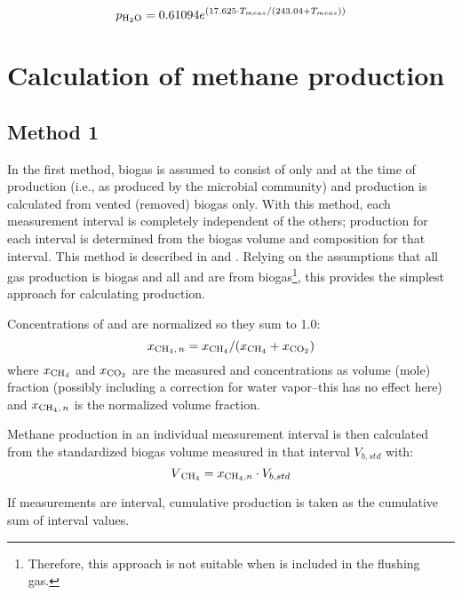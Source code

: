 \documentclass[]{article}
\begin{document}
\begin{equation}
\label{eq:magnus}
   p\textsubscript{H$_2$O} = 0.61094 e^{(17.625 \cdot T_{meas}/(243.04 + T_{meas}))}
\end{equation}

\section{Calculation of methane production}

\subsection{Method 1}
In the first method, biogas is assumed to consist of only  and  at the time of production (i.e., as produced by the microbial community) and  production is calculated from vented (removed) biogas only.
With this method, each measurement interval is completely independent of the others;  production for each interval is determined from the biogas volume and composition for that interval.
This method is described in \citet[Section 3]{richardsMethodsKineticanalysisMethane1991} and \citet[Eq. (7)]{vdiFermentationOrganicMaterials2016}.
Relying on the assumptions that all gas production is biogas and all  and  are from biogas\footnote{
  Therefore, this approach is not suitable when  is included in the flushing gas.
}, this provides the simplest approach for calculating  production.

Concentrations of  and  are normalized so they sum to 1.0:
\begin{equation}
  x\textsubscript{CH$_4$$, n$} = x\textsubscript{CH$_4$}/(x\textsubscript{CH$_4$} + x\textsubscript{CO$_2$})
\end{equation}
where $x\textsubscript{CH$_4$}$ and $x\textsubscript{CO$_2$}$ are the measured  and  concentrations as volume (mole) fraction (possibly including a correction for water vapor--this has no effect here) and $x\textsubscript{CH$_4$$, n$}$ is the normalized  volume fraction.

Methane production in an individual measurement interval is then calculated from the standardized biogas volume measured in that interval $V_{b,std}$ with:
\begin{equation}
  V\textsubscript{CH$_4$} = x\textsubscript{CH$_4$,$ n$} \cdot V_{b, std}
\end{equation}

If measurements are interval, cumulative  production is taken as the cumulative sum of interval values.
\end{document}
